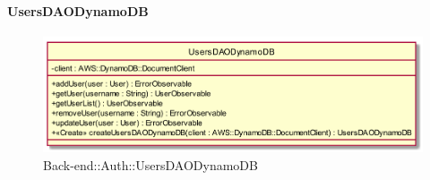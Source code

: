 \hypertarget{UsersDAODynamoDB_label}{\paragraph{UsersDAODynamoDB}}
\begin{figure}[h]
	\centering
	\includegraphics[width=\textwidth,height=\textheight,keepaspectratio]{images/ClassUsersDAODynamoDB.png}
	\caption{Back-end::Auth::UsersDAODynamoDB}
\end{figure}
